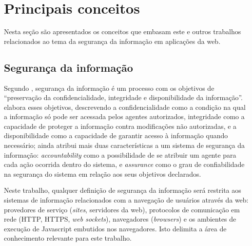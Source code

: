 \section{Principais conceitos}
Nesta seção são apresentados os conceitos que embasam este e outros trabalhos relacionados ao tema da segurança da informação em aplicações da web.

\subsection{Segurança da informação}
Segundo \cite{ISO2016}, segurança da informação é um processo com os objetivos de ``preservação da confidencialidade, integridade e disponibilidade da informação''. \cite{Foster1998} elabora esses objetivos, descrevendo a confidencialidade como a condição na qual a informação só pode ser acessada pelos agentes autorizados, integridade como a capacidade de proteger a informação contra modificações não autorizadas, e a disponibilidade como a capacidade de garantir acesso à informação quando necessário; \cite{Foster1998} ainda atribui mais duas características a um sistema de segurança da informação: \textit{accountability} como a possibilidade de se atribuir um agente para cada ação ocorrida dentro do sistema, e \textit{assurance} como o grau de confiabilidade na segurança do sistema em relação aos seus objetivos declarados.

Neste trabalho, qualquer definição de segurança da informação será restrita aos sistemas de informação relacionados com a navegação de usuários através da web: provedores de serviço (\textit{sites}, servidores da web), protocolos de comunicação em rede (HTTP, HTTPS, \textit{web sockets}), navegadores (\textit{browsers}) e os ambientes de execução de Javascript embutidos nos navegadores. Isto delimita a área de conhecimento relevante para este trabalho.


